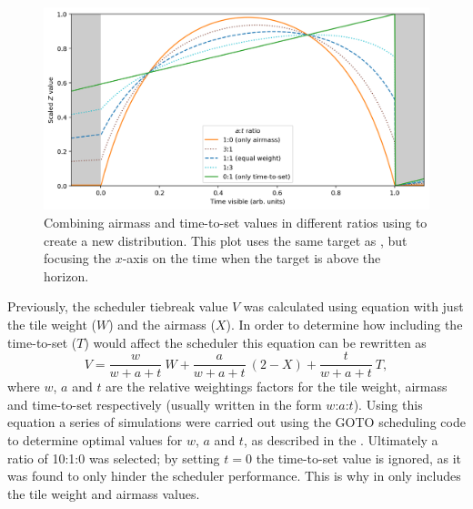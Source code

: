 \begin{colsection}
\begin{figure}[t]
    \begin{center}
        \includegraphics[width=\linewidth]{images/at_ratio.png}
    \end{center}
    \caption[Combining airmass and time-to-set values]{
        Combining airmass and time-to-set values in different ratios using  to create a new distribution. This plot uses the same target as , but focusing the $x$-axis on the time when the target is above the horizon.
    }\label{fig:at_ratio}
\end{figure}

\newpage

Previously, the scheduler tiebreak value $V$ was calculated using equation  with just the tile weight ($W$) and the airmass ($X$). In order to determine how including the time-to-set ($T$) would affect the scheduler this equation can be rewritten as
%
\begin{equation}
    V = \frac{w}{w+a+t}~W + \frac{a}{w+a+t}~(2-X) + \frac{t}{w+a+t}~T,
    \label{eq:wat}
\end{equation}
%
where $w$, $a$ and $t$ are the relative weightings factors for the tile weight, airmass and time-to-set respectively (usually written in the form $w$:$a$:$t$). Using this equation a series of simulations were carried out using the GOTO scheduling code to determine optimal values for $w$, $a$ and $t$, as described in the . Ultimately a ratio of 10:1:0 was selected; by setting $t=0$ the time-to-set value is ignored, as it was found to only hinder the scheduler performance. This is why  in  only includes the tile weight and airmass values.

\end{colsection}

